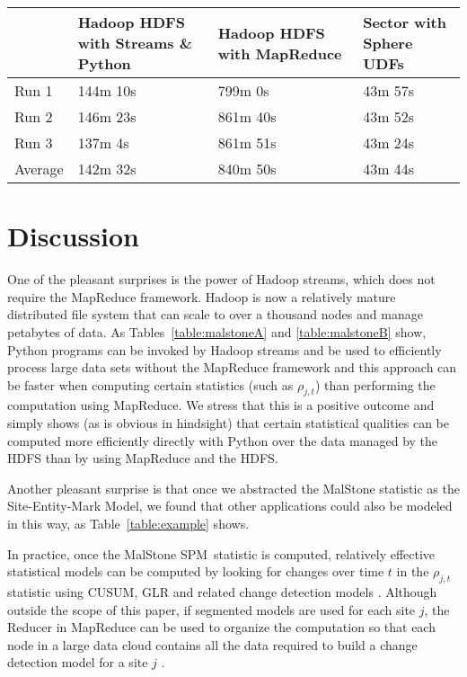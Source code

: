 \documentclass{acm_proc_article-sp}
\def\spm{\mbox{SPM}}
\def\malstone{MalStone } \def\malgen{MalGen }
\begin{document}
\begin{table*}
\begin{center}
\begin{tabular}{|p{1.0in}|p{1.0in}|p{1.0in}|p{1.0in}|} \hline
& {\bf Hadoop HDFS with Streams \& Python} & 
{\bf Hadoop HDFS with MapReduce} & {\bf Sector with 
Sphere UDFs} \\ \hline
Run 1	& 
        144m 10s &
	799m 0s &
	43m 57s  \\ \hline
Run 2  &
	146m 23s  &
	861m 40s &
	43m 52s \\ \hline
Run 3 &
	137m 4s &
	861m 51s &
	43m 24s  \\ \hline
Average	 &
        142m 32s &
	840m 50s  &
	43m 44s   \\ \hline
\end{tabular}
\end{center}
\caption{This table summarizes running \malstone B on 20 nodes.
        Each node had 500 million 100-byte
        \malstone records.  The tests used version 0.18.3 of Hadoop
        and version 1.20 of Sector.}
\label{table:malstoneB}
\end{table*}



\vfill
\section{Discussion}

One of the pleasant surprises is the power of Hadoop streams, which
does not require the MapReduce framework. Hadoop is now a relatively
mature distributed file system that can scale to over a thousand nodes
and manage petabytes of data. As Tables~\ref{table:malstoneA} and
\ref{table:malstoneB} show, Python programs can be invoked by Hadoop
streams and be used to efficiently process large data sets without the
MapReduce framework and this approach can be faster when computing
certain statistics (such as $\rho_{j,t}$) than performing the
computation using MapReduce. We stress that this is a positive outcome
and simply shows (as is obvious in hindsight) that certain statistical
qualities can be computed more efficiently directly with Python over
the data managed by the HDFS than by using MapReduce and the HDFS.

Another pleasant surprise is that once we abstracted the \malstone
statistic as the Site-Entity-Mark Model, we found that other
applications could also be modeled in this way, as
Table~\ref{table:example} shows.

In practice, once the \malstone \spm\ statistic is computed,
relatively effective statistical models can be computed by looking
for changes over time $t$ in the $\rho_{j,t}$ statistic using CUSUM,
GLR and related change detection models
\cite{Poor:QuickestDetection2008}.  Although outside the scope of this
paper, if segmented models are used for each site $j$, the Reducer in MapReduce 
can be used to organize the computation so that each node in a large
data cloud contains all the data required to build a change detection
model for a site $j$ \cite{Grossman:Sawmill}.
\end{document}
